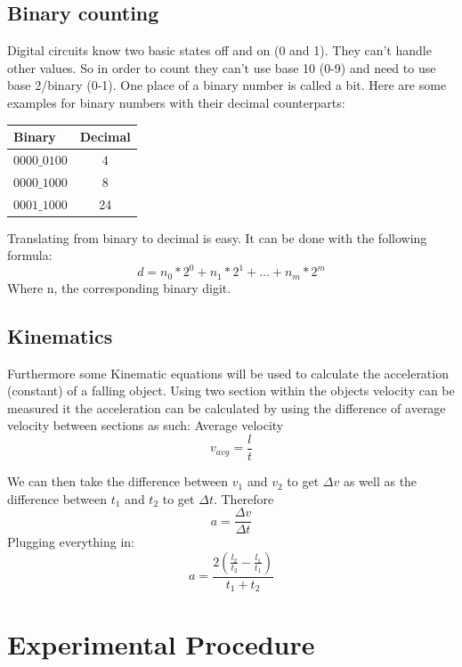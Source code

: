 \documentclass[fleqn,11pt]{article}
\begin{document}
\subsection{Binary counting}
Digital circuits know two basic states off and on (0 and 1). They can’t handle other values.
So in order to count they can’t use base 10 (0-9) and need to use base 2/binary (0-1).
One place of a binary number is called a bit. Here are some examples for binary numbers with
their decimal counterparts:

\vspace{0.5cm}
\begin{tabular}{lc}
  Binary & Decimal\\
  \midrule
  $0000\_0100$ & 4\\
  $0000\_1000$ & 8\\
  $0001\_1000$ & 24\\
\end{tabular}
\vspace{0.5cm}


Translating from binary to decimal is easy. It can be done with the following formula:
$$
d=n_0\ast2^0+n_1\ast2^1+\ldots+n_m\ast2^m
$$
Where n, the corresponding binary digit. 

\subsection{Kinematics}

Furthermore some Kinematic equations will be used to calculate the acceleration
(constant) of a falling object. Using two section within the objects velocity can be measured
it the acceleration can be calculated by using the difference of average velocity between
sections as such:
\newline
\newline
Average velocity
$$
v_{avg}=\frac{l}{t}
$$

We can then take the difference between $v_1$ and $v_2$ to get $\Delta v$ as well as the difference between
$t_1$ and $t_2$ to get $\Delta t$.
\newline
\newline
Therefore
$$
a = \frac{\Delta v}{\Delta t}
$$
Plugging everything in:
$$
a = \frac{2(\frac{l_2}{t_2}-\frac{l_1}{t_1})}{t_1+t_2}
$$

\section{Experimental Procedure}
\end{document}

